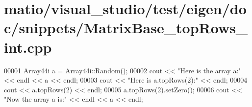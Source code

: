 \hypertarget{matio_2visual__studio_2test_2eigen_2doc_2snippets_2_matrix_base__top_rows__int_8cpp_source}{}\section{matio/visual\+\_\+studio/test/eigen/doc/snippets/\+Matrix\+Base\+\_\+top\+Rows\+\_\+int.cpp}
\label{matio_2visual__studio_2test_2eigen_2doc_2snippets_2_matrix_base__top_rows__int_8cpp_source}

\begin{DoxyCode}
00001 Array44i a = Array44i::Random();
00002 cout << \textcolor{stringliteral}{"Here is the array a:"} << endl << a << endl;
00003 cout << \textcolor{stringliteral}{"Here is a.topRows(2):"} << endl;
00004 cout << a.topRows(2) << endl;
00005 a.topRows(2).setZero();
00006 cout << \textcolor{stringliteral}{"Now the array a is:"} << endl << a << endl;
\end{DoxyCode}
